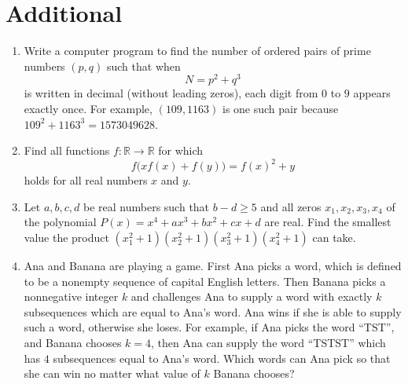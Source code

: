 \documentclass[11pt]{article}
\begin{document}
    \section{Additional}
      \begin{enumerate}[label=\textbf{\arabic*.}]
        \item Write a computer program to find the number of ordered pairs of prime numbers $(p,q)$ such that when
          \[
            N = p^2 + q^3
          \]
          is written in decimal (without leading zeros), each digit from $0$ to $9$ appears exactly once. For example, $(109,1163)$ is one
          such pair because $109^2 + 1163^3 = 1573049628$.
        \item Find all functions $f:\mathbb{R}\to\mathbb{R}$ for which
          \[
            f\big(xf(x)+f(y)\big)=f(x)^2+y
          \]
          holds for all real numbers $x$ and $y$.
        \item Let $a,b,c,d$ be real numbers such that $b-d\ge 5$ and all zeros $x_1,x_2,x_3,x_4$ of the polynomial $P(x)=x^4+ax^3+bx^2+cx+d$ are 
          real. Find the smallest value the product $(x_1^2+1)(x_2^2+1)(x_3^2+1)(x_4^2+1)$ can take.
        \item Ana and Banana are playing a game. First Ana picks a word, which is defined to be a nonempty sequence of capital English
          letters. Then Banana picks a nonnegative integer $k$ and challenges Ana to supply a word with exactly $k$ subsequences which are 
          equal to Ana's word. Ana wins if she is able to supply such a word, otherwise she loses. For example, if Ana picks the word “TST”,
          and Banana chooses $k=4$, then Ana can supply the word “TSTST” which has $4$ subsequences equal to Ana's word. Which words can Ana 
          pick so that she can win no matter what value of $k$ Banana chooses?
      \end{enumerate}
\end{document}
